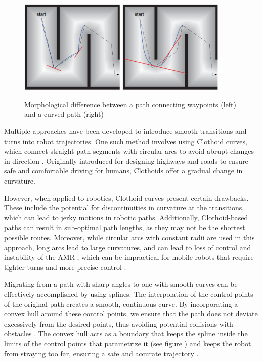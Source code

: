 \begin{figure}[H]
    \begin{center}
        \includegraphics[width=4in]{images/Chap2/sharp-vs-curved-path.png}\\
        \caption{Morphological difference between a path connecting waypoints (left) and a curved path 
        (right) \cite{R30}}
        \label{paths}
    \end{center}
\end{figure}

Multiple approaches have been developed to introduce smooth transitions and turns into robot trajectories. 
One such method involves using Clothoid curves, which connect straight path segments with circular arcs 
to avoid abrupt changes in direction \cite{R31}. Originally introduced for designing highways and roads to 
ensure safe and comfortable driving for humans, Clothoids offer a gradual change in curvature.

However, when applied to robotics, Clothoid curves present certain drawbacks. These include the potential 
for discontinuities in curvature at the transitions, which can lead to jerky motions in robotic paths. 
Additionally, Clothoid-based paths can result in sub-optimal path lengths, as they may not be the shortest 
possible routes. Moreover, while circular arcs with constant radii are used in this approach, long
arcs lead to large curvatures, and can lead to loss of control and instability of the AMR , which can 
be impractical for mobile robots that require tighter turns 
and more precise control \cite{R31}.

Migrating from a path with sharp angles to one with smooth curves can be effectively accomplished by 
using splines. The interpolation of the control points of the original path 
creates a smooth, continuous curve. By incorporating a convex hull around these control points, we 
ensure that the path does not deviate excessively from the desired points, thus avoiding potential 
collisions with obstacles \cite{R33}. The convex hull acts as a boundary that keeps the spline inside the limits of 
the control points that parametrize it (see figure ) and keeps the robot from straying 
too far, ensuring a safe and accurate trajectory \cite{R29}.


